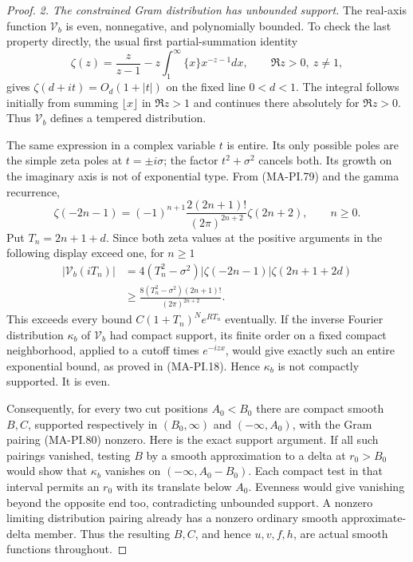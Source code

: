 \begin{proof}
\emph{2. The constrained Gram distribution has unbounded support.}
The real-axis function $\mathscr V_b$ is even, nonnegative,
and polynomially bounded. To check the last property directly,
the usual first partial-summation identity
\[
 \zeta(z)=\frac{z}{z-1}
               -z\int_1^\infty \{x\}x^{-z-1}dx,
                   \qquad\Re z>0,\ z\ne1,
 \tag{MA-PI.81}
\]
gives $\zeta(d+it)=O_d(1+|t|)$ on the fixed line
$0<d<1$. The integral follows initially from summing
$\lfloor x\rfloor$ in $\Re z>1$ and continues there
absolutely for $\Re z>0$. Thus $\mathscr V_b$ defines
a tempered distribution.

The same expression in a complex variable $t$ is entire.
Its only possible poles are the simple zeta poles at
$t=\pm i\sigma$; the factor $t^2+\sigma^2$ cancels
both. Its growth on the imaginary axis is not of
exponential type. From (MA-PI.79) and the gamma recurrence,
\[
 \zeta(-2n-1)=(-1)^{n+1}
       \frac{2(2n+1)!}{(2\pi)^{2n+2}}\zeta(2n+2),
                         \qquad n\ge0.
 \tag{MA-PI.82}
\]
Put $T_n=2n+1+d$. Since both zeta values at the positive
arguments in the following display exceed one, for $n\ge1$
\[
 \begin{aligned}
 |\mathscr V_b(iT_n)|
  &=4(T_n^2-\sigma^2)
          |\zeta(-2n-1)|\zeta(2n+1+2d)\\
  &\ge \frac{8(T_n^2-\sigma^2)(2n+1)!}{(2\pi)^{2n+2}}.
 \end{aligned}
 \tag{MA-PI.83}
\]
This exceeds every bound $C(1+T_n)^N e^{RT_n}$ eventually.
If the inverse Fourier distribution $\kappa_b$ of
$\mathscr V_b$ had compact support, its finite order on a
fixed compact neighborhood, applied to a cutoff times
$e^{-izx}$, would give exactly such an entire exponential
bound, as proved in (MA-PI.18). Hence $\kappa_b$ is not
compactly supported. It is even.

Consequently, for every two cut positions $A_0<B_0$ there
are compact smooth $B,C$, supported respectively in
$(B_0,\infty)$ and $(-\infty,A_0)$, with the Gram pairing
(MA-PI.80) nonzero. Here is the exact support argument.
If all such pairings vanished, testing $B$ by a smooth
approximation to a delta at $r_0>B_0$ would show that
$\kappa_b$ vanishes on $(-\infty,A_0-B_0)$. Each compact
test in that interval permits an $r_0$ with its translate
below $A_0$. Evenness would give vanishing beyond the
opposite end too, contradicting unbounded support.
A nonzero limiting distribution pairing already has a
nonzero ordinary smooth approximate-delta member. Thus
the resulting $B,C$, and hence $u,v,f,h$, are actual
smooth functions throughout.


\end{proof}
